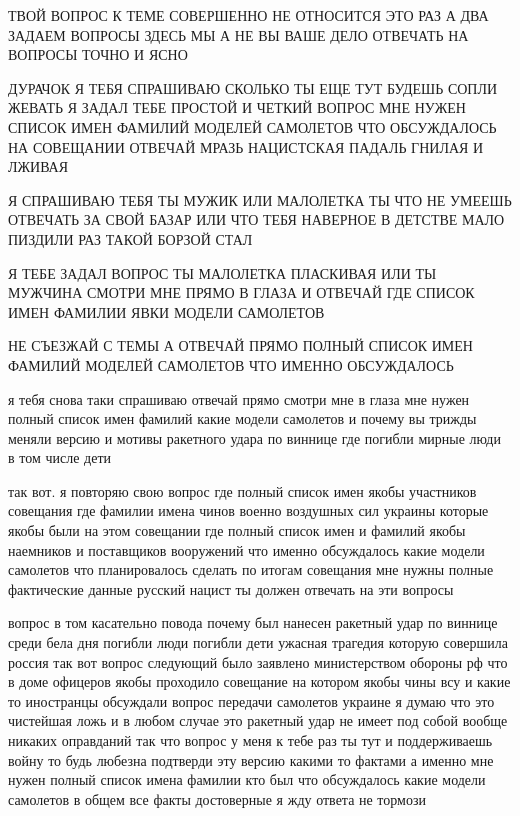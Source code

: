  
 
 
 
 

ТВОЙ ВОПРОС К ТЕМЕ СОВЕРШЕННО НЕ ОТНОСИТСЯ ЭТО РАЗ А ДВА ЗАДАЕМ ВОПРОСЫ ЗДЕСЬ
МЫ А НЕ ВЫ ВАШЕ ДЕЛО ОТВЕЧАТЬ НА ВОПРОСЫ ТОЧНО И ЯСНО

ДУРАЧОК Я ТЕБЯ СПРАШИВАЮ СКОЛЬКО ТЫ ЕЩЕ ТУТ БУДЕШЬ СОПЛИ ЖЕВАТЬ Я ЗАДАЛ ТЕБЕ
ПРОСТОЙ И ЧЕТКИЙ ВОПРОС МНЕ НУЖЕН СПИСОК ИМЕН ФАМИЛИЙ МОДЕЛЕЙ САМОЛЕТОВ ЧТО
ОБСУЖДАЛОСЬ НА СОВЕЩАНИИ ОТВЕЧАЙ МРАЗЬ НАЦИСТСКАЯ ПАДАЛЬ ГНИЛАЯ И ЛЖИВАЯ

Я СПРАШИВАЮ ТЕБЯ ТЫ МУЖИК ИЛИ МАЛОЛЕТКА ТЫ ЧТО НЕ УМЕЕШЬ ОТВЕЧАТЬ ЗА СВОЙ БАЗАР
ИЛИ ЧТО ТЕБЯ НАВЕРНОЕ В ДЕТСТВЕ МАЛО ПИЗДИЛИ РАЗ ТАКОЙ БОРЗОЙ СТАЛ

Я ТЕБЕ ЗАДАЛ ВОПРОС ТЫ МАЛОЛЕТКА ПЛАСКИВАЯ ИЛИ ТЫ МУЖЧИНА СМОТРИ МНЕ ПРЯМО В
ГЛАЗА И ОТВЕЧАЙ ГДЕ СПИСОК ИМЕН ФАМИЛИИ ЯВКИ МОДЕЛИ САМОЛЕТОВ

НЕ СЪЕЗЖАЙ С ТЕМЫ А ОТВЕЧАЙ ПРЯМО ПОЛНЫЙ СПИСОК ИМЕН ФАМИЛИЙ МОДЕЛЕЙ САМОЛЕТОВ
ЧТО ИМЕННО ОБСУЖДАЛОСЬ

я тебя снова таки спрашиваю отвечай прямо смотри мне в глаза мне нужен полный
список имен фамилий какие модели самолетов и почему вы трижды меняли версию и
мотивы ракетного удара по виннице где погибли мирные люди в том числе дети

так вот. я повторяю свою вопрос где полный список имен якобы участников
совещания где фамилии имена чинов военно воздушных сил украины которые якобы
были на этом совещании где полный список имен и фамилий якобы наемников и
поставщиков вооружений что именно обсуждалось какие модели самолетов что
планировалось сделать по итогам совещания мне нужны полные фактические данные
русский нацист ты должен отвечать на эти вопросы

вопрос в том касательно повода почему был нанесен ракетный удар по виннице
среди бела дня погибли люди погибли дети ужасная трагедия которую совершила
россия так вот вопрос следующий было заявлено министерством обороны рф что в
доме офицеров якобы проходило совещание на котором якобы чины всу и какие то
иностранцы обсуждали вопрос передачи самолетов украине я думаю что это
чистейшая ложь и в любом случае это ракетный удар не имеет под собой
вообще никаких оправданий так что вопрос у меня к тебе раз ты тут и поддерживаешь войну то
будь любезна подтверди эту версию какими то фактами а именно мне нужен полный
список имена фамилии кто был что обсуждалось какие модели самолетов в общем все
факты достоверные я жду ответа не тормози

